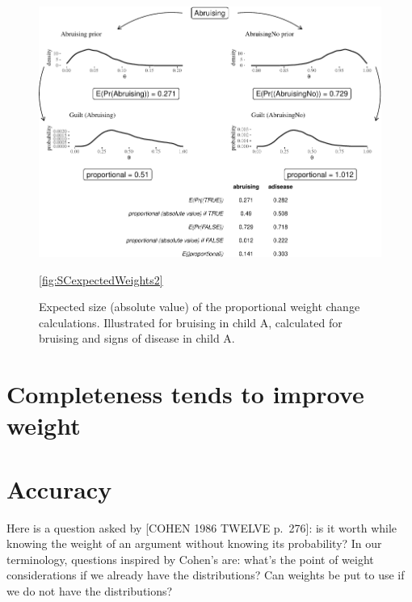 \documentclass[
  10pt,
  dvipsnames,enabledeprecatedfontcommands]{scrartcl}
\begin{document}
\begin{figure}


\begin{center}\includegraphics[width=1\linewidth]{imprecision_weight_files/figure-latex/SCexpectedWeights2b-1} \end{center}



\caption{Expected size (absolute value) of the proportional weight change calculations. Illustrated for bruising in child A, calculated for bruising and signs of disease in child A.}

\ref{fig:SCexpectedWeights2}
\end{figure}

\hypertarget{completeness-tends-to-improve-weight}{%
\section{Completeness tends to improve
weight}\label{completeness-tends-to-improve-weight}}

\hypertarget{accuracy}{%
\section{Accuracy}\label{accuracy}}

Here is a question asked by {[}COHEN 1986 TWELVE p.~276{]}: is it worth
while knowing the weight of an argument without knowing its probability?
In our terminology, questions inspired by Cohen's are: what's the point
of weight considerations if we already have the distributions? Can
weights be put to use if we do not have the distributions?
\end{document}
